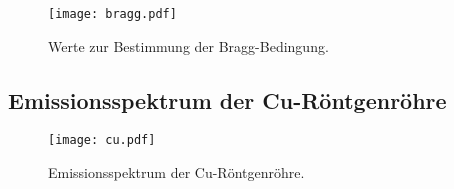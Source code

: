 \begin{figure}
  \centering
  \texttt{[image: bragg.pdf]}
  \caption{Werte zur Bestimmung der Bragg-Bedingung.}
  \label{fig:bragg}
\end{figure}

\subsection{Emissionsspektrum der Cu-Röntgenröhre}
\label{sec:cu}

\begin{figure}
  \centering
  \texttt{[image: cu.pdf]}
  \caption{Emissionsspektrum der Cu-Röntgenröhre.}
  \label{fig:cu}
\end{figure}